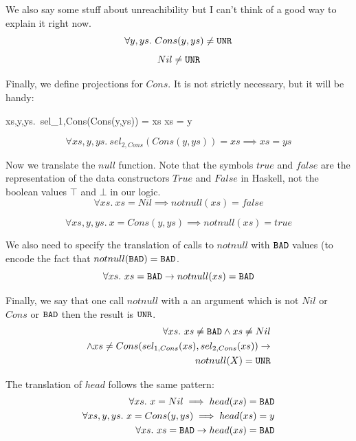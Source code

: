 \documentclass[preprint]{sigplanconf}
\begin{document}
We also say some stuff about unreachibility but I can't think of a
good way to explain it right now.
\begin{equation*}
\forall y,ys.~Cons(y,ys) \neq \texttt{UNR} 
\end{equation*}
\begin{equation*}
Nil \neq \texttt{UNR} 
\end{equation*}

Finally, we define projections for $Cons$. It is not strictly
necessary, but it will be handy:
\begin{equation**}
\forall xs,y,ys.~sel_{1,Cons}(Cons(y,ys)) = xs \implies xs = y 
\end{equation**}
\begin{equation*}
\forall xs,y,ys.~sel_{2,Cons}(Cons(y,ys)) = xs \implies xs = ys 
\end{equation*}

Now we translate the $null$ function. Note that the symbols $true$ and
$false$ are the representation of the data constructors $True$ and
$False$ in Haskell, not the boolean values $\top$ and $\bot$ in our
logic.
\begin{equation*}
\forall xs.~ xs=Nil \implies notnull(xs) = false
\end{equation*}

\begin{equation}
  \label{defnotnull}
\forall xs,y,ys.~ x=Cons(y,ys) \implies notnull(xs) = true
\end{equation}

We also need to specify the translation of calls to $notnull$ with
$\texttt{BAD}$ values (to encode the fact that $notnull(\texttt{BAD}) = \texttt{BAD}$.
\begin{equation*}
\forall xs.~xs=\texttt{BAD} \to notnull(xs) = \texttt{BAD}
\end{equation*}

Finally, we say that one call $notnull$ with a an argument which is
not $Nil$ or $Cons$ or $\texttt{BAD}$ then the result is $\texttt{UNR}$.
\begin{align}
  \label{unrnotnull}
  \forall xs.~xs \neq \texttt{BAD} \land xs \neq Nil  \notag \\
  \land xs \neq Cons(sel_{1,Cons}(xs),sel_{2,Cons}(xs)) \to  \notag \\
  notnull(X) = \texttt{UNR} 
\end{align}

The translation of $head$ follows the same pattern:
\begin{align}
  \forall xs.~ x=Nil \implies head(xs) = \texttt{BAD} \notag\\
  \forall xs,y,ys.~ x=Cons(y,ys) \implies head(xs) = y     \label{defhead} \\
    \forall xs.~xs=\texttt{BAD} \to head(xs) = \texttt{BAD} \notag
\end{align}
\end{document}
